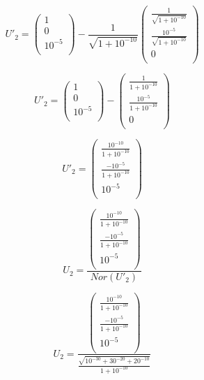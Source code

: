 \begin{enumerate}
    $$U'_{2} = \left( {\begin{array}{c}
                1\\
                0\\
                10^{-5} \\
            \end{array} } \right) - \frac{1}{\sqrt{1+10^{-10}}}\left( {\begin{array}{c}
                \frac{1}{\sqrt{1+10^{-10}}}\\
                \frac{10^{-5}}{\sqrt{1+10^{-10}}}\\
                0 \\
            \end{array} } \right)$$
            
    $$U'_{2} = \left( {\begin{array}{c}
                1\\
                0\\
                10^{-5} \\
            \end{array} } \right) - \left( {\begin{array}{c}
                \frac{1}{1+10^{-10}}\\
                \frac{10^{-5}}{1+10^{-10}}\\
                0 \\
            \end{array} } \right)$$
    
    $$U'_{2} = \left( {\begin{array}{c}
                \frac{10^{-10}}{1+10^{-10}}\\
                \frac{-10^{-5}}{1+10^{-10}}\\
                10^{-5} \\
            \end{array} } \right)$$
    
    $$U_{2} =\frac{ \left( {\begin{array}{c}
                \frac{10^{-10}}{1+10^{-10}}\\
                \frac{-10^{-5}}{1+10^{-10}}\\
                10^{-5} \\
            \end{array} } \right)}{Nor(U'_{2})}$$
    
    $$U_{2} =\frac{ \left( {\begin{array}{c}
                \frac{10^{-10}}{1+10^{-10}}\\
                \frac{-10^{-5}}{1+10^{-10}}\\
                10^{-5} \\
            \end{array} } \right)}{\frac{\sqrt{10^{-30}+30^{-20}+20^{-10}}}{1+10^{-10}}}$$
    

\end{enumerate}
